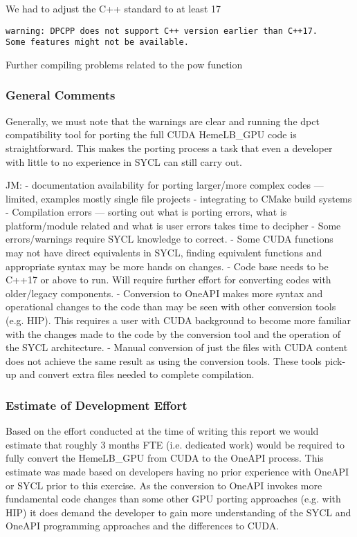\documentclass[../main]{subfiles}
\begin{document}
We had to adjust the C++ standard to at least 17
\begin{verbatim}
warning: DPCPP does not support C++ version earlier than C++17.
Some features might not be available.
\end{verbatim}

Further compiling problems related to the pow function

\subsubsection{General Comments}
Generally, we must note that the warnings are clear and running the dpct compatibility tool for porting the full CUDA HemeLB\_GPU code is straightforward. This makes the porting process a task that even a developer with little to no experience in SYCL can still carry out.

JM:
- documentation availability for porting larger/more complex codes --- limited, examples mostly single file projects
- integrating to CMake build systems
- Compilation errors --- sorting out what is porting errors, what is platform/module related and what is user errors takes time to decipher
- Some errors/warnings require SYCL knowledge to correct.
- Some CUDA functions may not have direct equivalents in SYCL, finding equivalent functions and appropriate syntax may be more hands on changes.
- Code base needs to be C++17 or above to run. Will require further effort for converting codes with older/legacy components.
- Conversion to OneAPI makes more syntax and operational changes to the code than may be seen with other conversion tools (e.g. HIP). This requires a user with CUDA background to become more familiar with the changes made to the code by the conversion tool and the operation of the SYCL architecture.
- Manual conversion of just the files with CUDA content does not achieve the same result as using the conversion tools. These tools pick-up and convert extra files needed to complete compilation.

\subsubsection{Estimate of Development Effort}
Based on the effort conducted at the time of writing this report we would estimate that roughly 3 months FTE (i.e. dedicated work) would be required to fully convert the HemeLB\_GPU from CUDA to the OneAPI process.
This estimate was made based on developers having no prior experience with OneAPI or SYCL prior to this exercise.
As the conversion to OneAPI invokes more fundamental code changes than some other GPU porting approaches (e.g. with HIP) it does demand the developer to gain more understanding of the SYCL and OneAPI programming approaches and the differences to CUDA.
\end{document}
